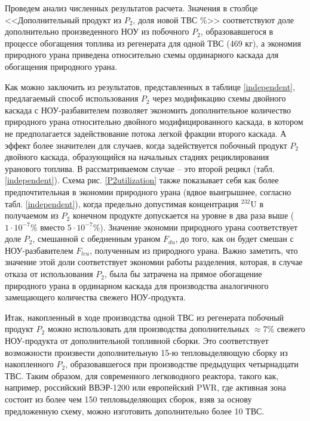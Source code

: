 Проведем анализ численных результатов расчета. Значения в столбце <<Дополнительный продукт из $P_2$, доля новой ТВС \%>> соответствуют доле дополнительно произведенного НОУ из побочного $P_2$, образовавшегося в процессе обогащения топлива из регенерата для одной ТВС (469 кг), а экономия природного урана приведена относительно схемы ординарного каскада для обогащения природного урана.

Как можно заключить из результатов, представленных в таблице \ref{independent}, предлагаемый способ использования $P_2$ через модификацию схемы двойного каскада с НОУ-разбавителем позволяет экономить дополнительное количество природного урана относительно двойного модифицированного каскада, в котором не предполагается задействование потока легкой фракции второго каскада. А эффект более значителен для случаев, когда задействуется побочный продукт $P_2$ двойного каскада, образующийся на начальных стадиях рециклирования уранового топлива. В рассматриваемом случае -- это второй рецикл (табл. \ref{independent}). Схема рис. \ref{P2utilization} также показывает себя как более предпочтительная в экономии природного урана (вдвое выигрышнее, согласно табл. \ref{independent}), когда предельно допустимая концентрация $^{232}$U в получаемом из $P_2$ конечном продукте допускается на уровне в два раза выше ($1\cdot10^{-7}$\% вместо $5\cdot10^{-7}$\%).  Значение экономии природного урана соответствует доле $P_2$, смешанной с обедненным ураном $F_{du}$, до того, как он будет смешан с НОУ-разбавителем $F_{leu}$, полученным из природного урана. Важно заметить, что значение этой доли соответствует экономии работы разделения, которая, в случае отказа от использования $P_2$, была бы затрачена на прямое обогащение природного урана в ординарном каскада для производства аналогичного замещающего количества свежего НОУ-продукта.

Итак, накопленный в ходе производства одной ТВС из регенерата побочный продукт $P_2$ можно использовать для производства дополнительных $\approx$7\% свежего НОУ-продукта от дополнительной топливной сборки. Это соответствует возможности произвести дополнительную 15-ю тепловыделяющую сборку из накопленного $P_2$, образовавшегося при производстве предыдущих четырнадцати ТВС. Таким образом, для современного легководного реактора, такого как, например, российский ВВЭР-1200 или европейский PWR, где активная зона состоит из более чем 150 тепловыделяющих сборок, взяв за основу предложенную схему, можно изготовить дополнительно более 10 ТВС. 





